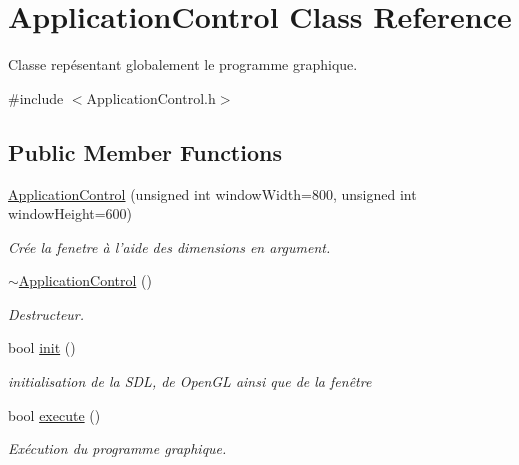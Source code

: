 \hypertarget{classApplicationControl}{\section{Application\+Control Class Reference}
\label{classApplicationControl}
}


Classe repésentant globalement le programme graphique.  




{\ttfamily \#include $<$Application\+Control.\+h$>$}

\subsection*{Public Member Functions}
\begin{DoxyCompactItemize}
\item 
\hypertarget{classApplicationControl_a0297dd9aebc1dec0b82ec9b52ef834ad}{\hyperlink{classApplicationControl_a0297dd9aebc1dec0b82ec9b52ef834ad}{Application\+Control} (unsigned int window\+Width=800, unsigned int window\+Height=600)}\label{classApplicationControl_a0297dd9aebc1dec0b82ec9b52ef834ad}

\begin{DoxyCompactList}\small\item\em Crée la fenetre à l'aide des dimensions en argument. \end{DoxyCompactList}\item 
\hypertarget{classApplicationControl_a77142ab2e6afa9bc4b470a00b41aed77}{\hyperlink{classApplicationControl_a77142ab2e6afa9bc4b470a00b41aed77}{$\sim$\+Application\+Control} ()}\label{classApplicationControl_a77142ab2e6afa9bc4b470a00b41aed77}

\begin{DoxyCompactList}\small\item\em Destructeur. \end{DoxyCompactList}\item 
\hypertarget{classApplicationControl_a11c3f05fcf4c19e4be15ef49cec06a43}{bool \hyperlink{classApplicationControl_a11c3f05fcf4c19e4be15ef49cec06a43}{init} ()}\label{classApplicationControl_a11c3f05fcf4c19e4be15ef49cec06a43}

\begin{DoxyCompactList}\small\item\em initialisation de la S\+D\+L, de Open\+G\+L ainsi que de la fenêtre \end{DoxyCompactList}\item 
\hypertarget{classApplicationControl_ae2fa75e6d29ef2479d47076f1a780113}{bool \hyperlink{classApplicationControl_ae2fa75e6d29ef2479d47076f1a780113}{execute} ()}\label{classApplicationControl_ae2fa75e6d29ef2479d47076f1a780113}

\begin{DoxyCompactList}\small\item\em Exécution du programme graphique. \end{DoxyCompactList}\end{DoxyCompactItemize}


